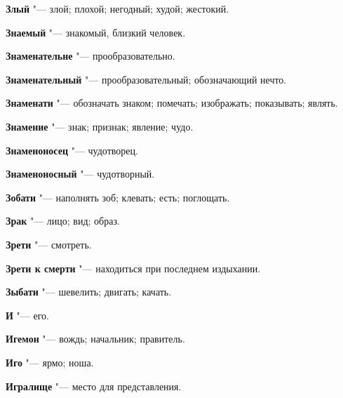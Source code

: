 \begin{mymulticols}{2}
\noindent\textbf{Злый} "--- злой; плохой; негодный; худой; жестокий. 




\noindent\textbf{Знаемый} "--- знакомый, близкий человек. 




\noindent\textbf{Знаменательне} "--- прообразовательно. 




\noindent\textbf{Знаменательный} "--- прообразовательный; обозначающий нечто. 




\noindent\textbf{Знаменати} "--- обозначать знаком; помечать; изображать; показывать; являть. 




\noindent\textbf{Знамение} "--- знак; признак; явление; чудо. 




\noindent\textbf{Знаменоносец} "--- чудотворец. 




\noindent\textbf{Знаменоносный} "--- чудотворный. 




\noindent\textbf{Зобати} "--- наполнять зоб; клевать; есть; поглощать. 




\noindent\textbf{Зрак} "--- лицо; вид; образ. 




\noindent\textbf{Зрети} "--- смотреть. 




\noindent\textbf{Зрети к смерти} "--- находиться при последнем издыхании. 




\noindent\textbf{Зыбати} "--- шевелить; двигать; качать. 




\bukvaending






\noindent\textbf{И} "--- его. 




\noindent\textbf{Игемон} "--- вождь; начальник; правитель. 




\noindent\textbf{Иго} "--- ярмо; ноша. 




\noindent\textbf{Игралище} "--- место для представления. 





\end{mymulticols}

